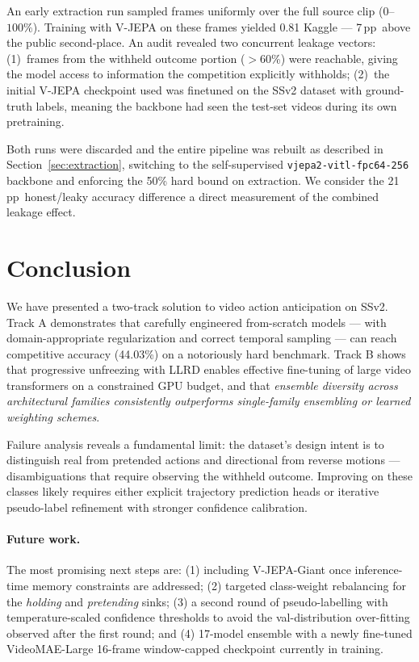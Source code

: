 \documentclass[10pt,twocolumn,letterpaper]{article}
\newcommand{\pp}{\,pp}
\begin{document}
An early extraction run sampled frames uniformly over the full source
clip ($0$--$100\%$).  Training with V-JEPA on these frames yielded 0.81
Kaggle --- 7\pp\ above the public second-place.  An audit revealed two
concurrent leakage vectors:
(1)~frames from the withheld outcome portion ($>$60\%) were reachable,
giving the model access to information the competition explicitly
withholds;
(2)~the initial V-JEPA checkpoint used was finetuned on the SSv2
dataset with ground-truth labels, meaning the backbone had seen the
test-set videos during its own pretraining.

Both runs were discarded and the entire pipeline was rebuilt as described
in Section~\ref{sec:extraction}, switching to the self-supervised
\texttt{vjepa2-vitl-fpc64-256} backbone and enforcing the 50\% hard
bound on extraction.  We consider the 21\pp\ honest/leaky accuracy
difference a direct measurement of the combined leakage effect.

\section{Conclusion}
\label{sec:conclusion}

We have presented a two-track solution to video action anticipation on
SSv2.  Track A demonstrates that carefully engineered from-scratch models
--- with domain-appropriate regularization and correct temporal sampling
--- can reach competitive accuracy (44.03\%) on a notoriously hard
benchmark.  Track B shows that progressive unfreezing with LLRD enables
effective fine-tuning of large video transformers on a constrained GPU
budget, and that \emph{ensemble diversity across architectural families
consistently outperforms single-family ensembling or learned weighting
schemes}.

Failure analysis reveals a fundamental limit: the dataset's design intent
is to distinguish real from pretended actions and directional from
reverse motions — disambiguations that require observing the withheld
outcome.  Improving on these classes likely requires either explicit
trajectory prediction heads or iterative pseudo-label refinement with
stronger confidence calibration.

\paragraph{Future work.}
The most promising next steps are: (1) including V-JEPA-Giant once
inference-time memory constraints are addressed; (2) targeted class-weight
rebalancing for the \emph{holding} and \emph{pretending} sinks; (3) a
second round of pseudo-labelling with temperature-scaled confidence
thresholds to avoid the val-distribution over-fitting observed after the
first round; and (4) 17-model ensemble with a newly fine-tuned
VideoMAE-Large 16-frame window-capped checkpoint currently in training.
\end{document}
